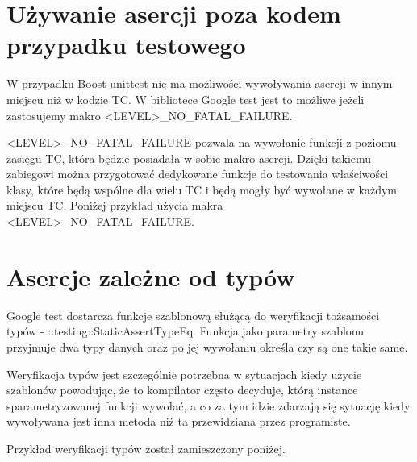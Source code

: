\documentclass[12pt,a4paper,notitlepage]{report}
\begin{document}
\section{Używanie asercji poza kodem przypadku testowego}

W przypadku Boost unittest nie ma możliwości wywoływania asercji w innym miejscu niż w kodzie TC. W bibliotece Google test jest to możliwe jeżeli zastosujemy makro <LEVEL>{\_}NO{\_}FATAL{\_}FAILURE.

<LEVEL>{\_}NO{\_}FATAL{\_}FAILURE pozwala na wywołanie funkcji z poziomu zasięgu TC, która będzie posiadała w sobie makro asercji. Dzięki takiemu zabiegowi można przygotować dedykowane funkcje do testowania właściwości klasy, które będą wspólne dla wielu TC i będą mogły być wywołane w każdym miejscu TC. Poniżej przykład użycia makra <LEVEL>{\_}NO{\_}FATAL{\_}FAILURE.

			

\section{Asercje zależne od typów}

Google test dostarcza funkcje szablonową służącą do weryfikacji tożsamości typów - ::testing::StaticAssertTypeEq. Funkcja jako parametry szablonu przyjmuje dwa typy danych oraz po jej wywołaniu określa czy są one takie same.

Weryfikacja typów jest szczególnie potrzebna w sytuacjach kiedy użycie szablonów powodując, że to kompilator często decyduje, którą instance sparametryzowanej funkcji wywołać, a co za tym idzie zdarzają się sytuację kiedy wywoływana jest inna metoda niż ta przewidziana przez programiste.

Przykład weryfikacji typów został zamieszczony poniżej.

			
\end{document}

